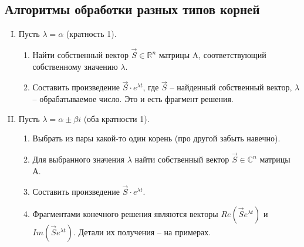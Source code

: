\documentclass[10pt, a4paper]{article}
\begin{document}
\subsection{Алгоритмы обработки разных типов корней}
\begin{enumerate}[I.]
    \item Пусть $\lambda = \alpha$ (кратность 1).
        \begin{enumerate}
            \item Найти собственный вектор $\Vec{S} \in \mathbb{R}^n$ матрицы A, соответствующий собственному значению $\lambda$.
            \item Составить произведение $\Vec{S} \cdot e^{\lambda t}$, где $\Vec{S}$ -- найденный собственный вектор, $\lambda$ -- обрабатываемое число. Это и есть фрагмент решения.
        \end{enumerate}
    \item Пусть $\lambda = \alpha \pm \beta i$ (оба кратности 1).
        \begin{enumerate}
            \item Выбрать из пары какой-то один корень (про другой забыть навечно).
            \item Для выбранного значения $\lambda$ найти собственный вектор $\Vec{S} \in \mathbb{C}^{n}$ матрицы А.
            \item Составить произведение $\Vec{S} \cdot e^{\lambda t}$.
            \item Фрагментами конечного решения являются векторы $Re(\Vec{S}e^{\lambda t})$ и $Im(\Vec{S}e^{\lambda t})$. Детали их получения -- на примерах.
        \end{enumerate}
\end{enumerate}
\end{document}
